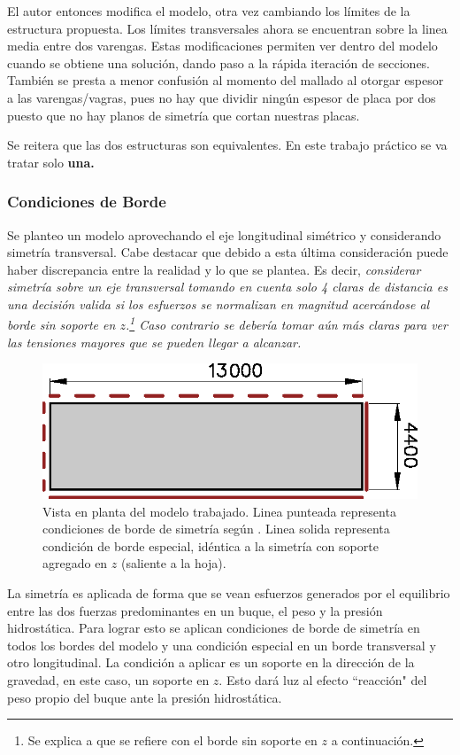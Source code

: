 \documentclass[onecolumn,10pt,titlepage]{article}
\begin{document}
El autor entonces modifica el modelo, otra vez cambiando los límites de la estructura propuesta. Los límites transversales ahora se encuentran sobre la linea media entre dos varengas. Estas modificaciones permiten ver dentro del modelo cuando se obtiene una solución, dando paso a la rápida iteración de secciones. También se presta a menor confusión al momento del mallado al otorgar espesor a las varengas/vagras, pues no hay que dividir ningún espesor de placa por dos \citep{cook2007concepts} puesto que no hay planos de simetría que cortan nuestras placas.

Se reitera que las dos estructuras son equivalentes. En este trabajo práctico se va tratar solo \textbf{una.}

\subsubsection*{Condiciones de Borde} 

Se planteo un modelo aprovechando el eje longitudinal simétrico y considerando simetría transversal. Cabe destacar que debido a esta última consideración puede haber discrepancia entre la realidad y lo que se plantea. Es decir, \emph{considerar simetría sobre un eje transversal tomando en cuenta solo 4 claras de distancia es una decisión valida si los esfuerzos se normalizan en magnitud acercándose al borde sin soporte en $z$.\footnote{Se explica a que se refiere con el borde sin soporte en $z$ a continuación.} Caso contrario se debería tomar aún más claras para ver las tensiones mayores que se pueden llegar a alcanzar.}

\begin{figure}[htb!]
	\centering
	\includegraphics[width=.6\textwidth]{fig/modelnx.eps}
	\caption{Vista en planta del modelo trabajado. Linea punteada representa condiciones de borde de simetría según \citep{cook2007concepts}. Linea solida representa condición de borde especial, idéntica a la simetría con soporte agregado en $z$ (saliente a la hoja).}
	\label{fig:modeloPlanta}
\end{figure}


La simetría es aplicada de forma que se vean esfuerzos generados por el equilibrio entre las dos fuerzas predominantes en un buque, el peso y la presión hidrostática. Para lograr esto se aplican condiciones de borde de simetría en todos los bordes del modelo y una condición especial en un borde transversal y otro longitudinal. La condición a aplicar es un soporte en la dirección de la gravedad, en este caso, un soporte en $z$. Esto dará luz al efecto ``reacción"{} del peso propio del buque ante la presión hidrostática.
\end{document}
